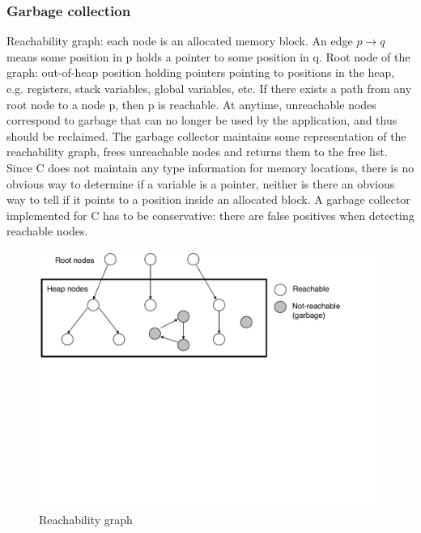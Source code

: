 \subsubsection{Garbage collection}
Reachability graph: each node is an allocated memory block. An edge $p\rightarrow q$ means some position in p holds a pointer to some position in q. Root node of the graph: out-of-heap position holding pointers pointing to positions in the heap, e.g. registers, stack variables, global variables, etc. If there exists a path from any root node to a node p, then p is reachable. At anytime, unreachable nodes correspond to garbage that can no longer be used by the application, and thus should be reclaimed. The garbage collector maintains some representation of the reachability graph, frees unreachable nodes and returns them to the free list. Since C does not maintain any type information for memory locations, there is no obvious way to determine if a variable is a pointer, neither is there an obvious way to tell if it points to a position inside an allocated block. A garbage collector implemented for C has to be conservative: there are false positives when detecting reachable nodes.
\begin{figure}[ht]
\centering
\includegraphics[width=\textwidth]{reach_graph.pdf}
\caption{Reachability graph}
\end{figure}
\ifx\PREAMBLE\undefined

\fi